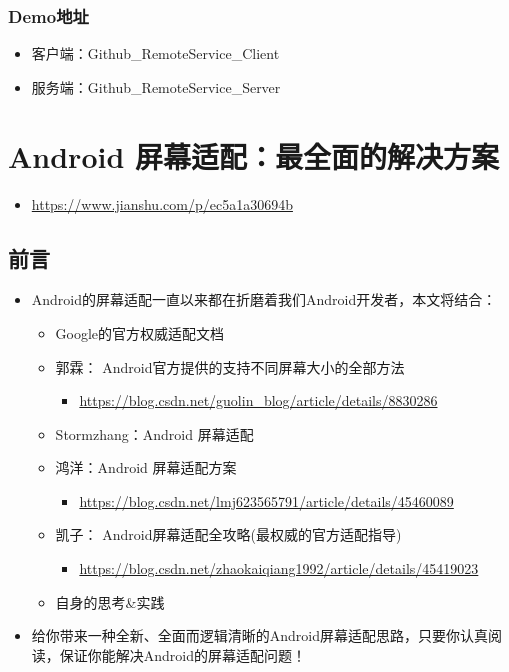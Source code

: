 \documentclass[9pt, b5paper]{article}
\begin{document}
\subsubsection{Demo地址}
\label{sec-5-6-4}
\begin{itemize}
\item 客户端：Github\_RemoteService\_Client
\item 服务端：Github\_RemoteService\_Server
\end{itemize}

\section{Android 屏幕适配：最全面的解决方案}
\label{sec-6}
\begin{itemize}
\item \url{https://www.jianshu.com/p/ec5a1a30694b}
\end{itemize}
\subsection{前言}
\label{sec-6-1}
\begin{itemize}
\item Android的屏幕适配一直以来都在折磨着我们Android开发者，本文将结合：
\begin{itemize}
\item Google的官方权威适配文档
\item 郭霖： Android官方提供的支持不同屏幕大小的全部方法 
\begin{itemize}
\item \url{https://blog.csdn.net/guolin_blog/article/details/8830286}
\end{itemize}
\item Stormzhang：Android 屏幕适配
\item 鸿洋：Android 屏幕适配方案
\begin{itemize}
\item \url{https://blog.csdn.net/lmj623565791/article/details/45460089}
\end{itemize}
\item 凯子： Android屏幕适配全攻略(最权威的官方适配指导)
\begin{itemize}
\item \url{https://blog.csdn.net/zhaokaiqiang1992/article/details/45419023}
\end{itemize}
\item 自身的思考\&实践
\end{itemize}
\item 给你带来一种全新、全面而逻辑清晰的Android屏幕适配思路，只要你认真阅读，保证你能解决Android的屏幕适配问题！
\end{itemize}
\end{document}
